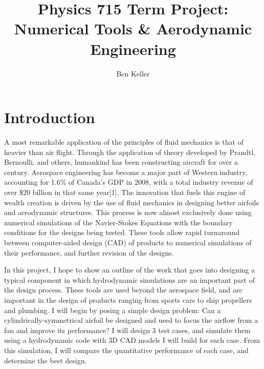 \documentclass[12pt]{article}
\begin{document}
\title{Physics 715 Term Project:  Numerical Tools \& Aerodynamic Engineering}
\author{Ben Keller}
\maketitle
\newpage

\section{Introduction}
A most remarkable application of the principles of fluid mechanics is that of
heavier than air flight.  Through the application of theory developed by 
Prandtl, Bernoulli, and others, humankind has been constructing aircraft for 
over a century.  Aerospace engineering has become a major part of Western 
industry, accounting for 1.6\% of Canada's GDP in 2008, with a total industry
revenue of over \$20 billion in that same year[1].  The innovation that fuels
this engine of wealth creation is driven by the use of fluid mechanics in 
designing better airfoils and aerodynamic structures.  This process is now 
almost exclusively done using numerical simulations of the Navier-Stokes
Equations with the boundary conditions for the designs being tested.  These 
tools allow rapid turnaround between computer-aided design (CAD) of products
to numerical simulations of their performance, and further revision of the
designs.\par

In this project, I hope to show an outline of the work that goes into designing
a typical component in which hydrodynamic simulations are an important part of
the design process.  These tools are used beyond the aerospace field, and are 
important in the design of products ranging from sports cars to ship propellers
and plumbing.  I will begin by posing a simple design problem: Can a 
cylindrically-symmetrical airfoil be designed and used to focus the airflow
from a fan and improve its performance?  I will design 3 test cases, and simulate
them using a hydrodynamic code with 3D CAD models I will build for each case. 
From this simulation, I will compare the quantitative performance of each case,
and determine the best design.
\end{document}
